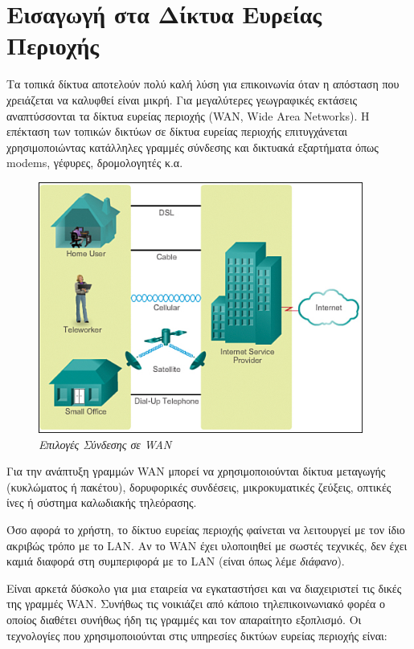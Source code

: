 %
%
\section*{Εισαγωγή στα Δίκτυα Ευρείας Περιοχής}

Τα τοπικά δίκτυα αποτελούν πολύ καλή λύση για επικοινωνία όταν η απόσταση που χρειάζεται να καλυφθεί είναι μικρή. Για μεγαλύτερες γεωγραφικές εκτάσεις αναπτύσσονται τα δίκτυα ευρείας περιοχής (WAN, Wide Area Networks). Η επέκταση των τοπικών δικτύων σε δίκτυα ευρείας περιοχής επιτυγχάνεται χρησιμοποιώντας κατάλληλες γραμμές σύνδεσης και δικτυακά εξαρτήματα όπως modems, γέφυρες, δρομολογητές κ.α.

\begin{figure}[!ht]
  \centering
  \includegraphics[width=0.95\textwidth]{images/chapter5/5-1}
  \caption {\textsl{Επιλογές Σύνδεσης σε WAN}}
  \label{5-1}
\end{figure} 

Για την ανάπτυξη γραμμών WAN μπορεί να χρησιμοποιούνται δίκτυα μεταγωγής (κυκλώματος ή πακέτου), δορυφορικές συνδέσεις, μικροκυματικές ζεύξεις, οπτικές ίνες ή σύστημα καλωδιακής τηλεόρασης.

Όσο αφορά το χρήστη, το δίκτυο ευρείας περιοχής φαίνεται να λειτουργεί με τον ίδιο ακριβώς τρόπο με το LAN. Αν το WAN έχει υλοποιηθεί με σωστές τεχνικές, δεν έχει καμιά διαφορά στη συμπεριφορά με το LAN (είναι όπως λέμε \emph{διάφανο}).

Είναι αρκετά δύσκολο για μια εταιρεία να εγκαταστήσει και να διαχειριστεί τις δικές της γραμμές WAN. Συνήθως τις νοικιάζει από κάποιο τηλεπικοινωνιακό φορέα ο οποίος διαθέτει συνήθως ήδη τις γραμμές και τον απαραίτητο εξοπλισμό. Οι τεχνολογίες που χρησιμοποιούνται στις υπηρεσίες δικτύων ευρείας περιοχής είναι:

